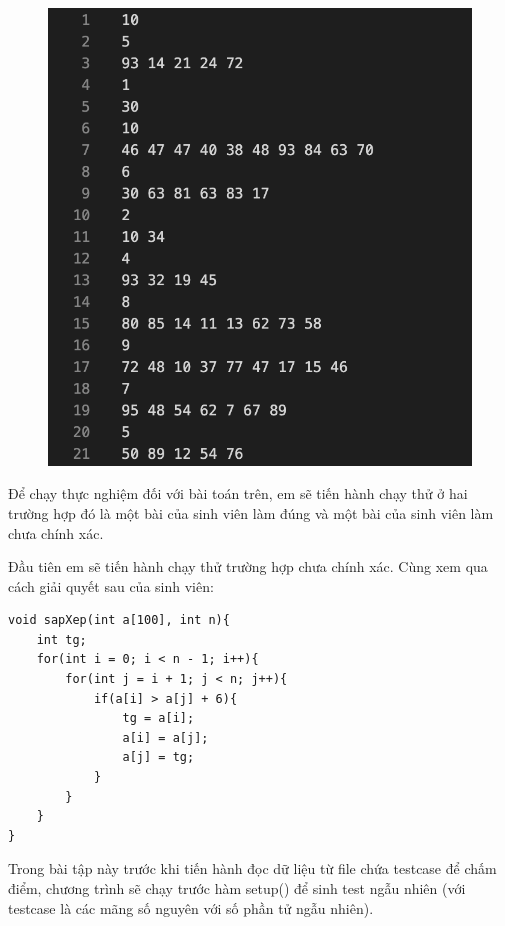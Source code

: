 \documentclass[12pt,a4paper]{report}
\begin{document}
\begin{figure}[ht]
\begin{center}
\includegraphics[scale=0.3]{hinhanh/testcasearray.png}
\end{center}
\end{figure}

Để chạy thực nghiệm đối với bài toán trên, em sẽ tiến hành chạy thử ở hai trường hợp đó là một bài của sinh viên làm đúng và một bài của sinh viên làm chưa chính xác.

Đầu tiên em sẽ tiến hành chạy thử trường hợp chưa chính xác. Cùng xem qua cách giải quyết sau của sinh viên:

\begin{lstlisting}
void sapXep(int a[100], int n){
    int tg;
    for(int i = 0; i < n - 1; i++){
        for(int j = i + 1; j < n; j++){
            if(a[i] > a[j] + 6){
                tg = a[i];
                a[i] = a[j];
                a[j] = tg;        
            }
        }
    }
}
\end{lstlisting}

Trong bài tập này trước khi tiến hành đọc dữ liệu từ file chứa testcase để chấm điểm, chương trình sẽ chạy trước hàm setup() để sinh test ngẫu nhiên (với testcase là các mãng số nguyên với số phần tử ngẫu nhiên).
\end{document}
